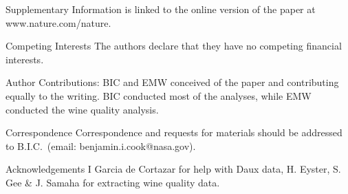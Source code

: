\documentclass[final]{nature}
\begin{document}



\begin{addendum}
 \item [Supplementary Information] is linked to the online version of the paper at www.nature.com/nature.
 \item[Competing Interests] The authors declare that they have no
competing financial interests.
\item [Author Contributions:] BIC and EMW conceived of the paper and contributing equally to the writing. BIC conducted most of the analyses, while EMW conducted the wine quality analysis.
 \item[Correspondence] Correspondence and requests for materials
should be addressed to B.I.C.~(email: benjamin.i.cook@nasa.gov).
 \item[Acknowledgements] I Garcia de Cortazar for help with Daux data, H. Eyster, S. Gee \& J. Samaha for extracting wine quality data.
\end{addendum}
\end{document}
